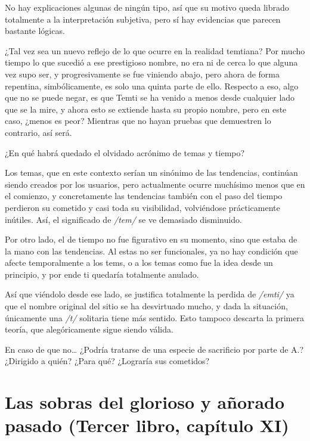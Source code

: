 \documentclass[
]{book}
\begin{document}
No hay explicaciones algunas de ningún tipo, así que su motivo queda librado totalmente a la interpretación subjetiva, pero sí hay evidencias que parecen bastante lógicas.

¿Tal vez sea un nuevo reflejo de lo que ocurre en la realidad temtiana? Por mucho tiempo lo que sucedió a ese prestigioso nombre, no era ni de cerca lo que alguna vez supo ser, y progresivamente se fue viniendo abajo, pero ahora de forma repentina, simbólicamente, es solo una quinta parte de ello. Respecto a eso, algo que no se puede negar, es que Temti se ha venido a menos desde cualquier lado que se la mire, y ahora esto se extiende hasta su propio nombre, pero en este caso, ¿menos es peor? Mientras que no hayan pruebas que demuestren lo contrario, así será.

¿En qué habrá quedado el olvidado acrónimo de temas y tiempo?

Los temas, que en este contexto serían un sinónimo de las tendencias, continúan siendo creados por los usuarios, pero actualmente ocurre muchísimo menos que en el comienzo, y concretamente las tendencias también con el paso del tiempo perdieron su cometido y casi toda su visibilidad, volviéndose prácticamente inútiles. Así, el significado de \emph{/tem/} se ve demasiado disminuido.

Por otro lado, el de tiempo no fue figurativo en su momento, sino que estaba de la mano con las tendencias. Al estas no ser funcionales, ya no hay condición que afecte temporalmente a los tems, o a los temas como fue la idea desde un principio, y por ende ti quedaría totalmente anulado.

Así que viéndolo desde ese lado, se justifica totalmente la perdida de \emph{/emti/} ya que el nombre original del sitio se ha desvirtuado mucho, y dada la situación, únicamente una \emph{/t/} solitaria tiene más sentido. Esto tampoco descarta la primera teoría, que alegóricamente sigue siendo válida.

En caso de que no\ldots{} ¿Podría tratarse de una especie de sacrificio por parte de A.? ¿Dirigido a quién? ¿Para qué? ¿Lograría sus cometidos?

\hypertarget{las-sobras-del-glorioso-y-auxf1orado-pasado-tercer-libro-capuxedtulo-xi}{%
\section{Las sobras del glorioso y añorado pasado (Tercer libro, capítulo XI)}\label{las-sobras-del-glorioso-y-auxf1orado-pasado-tercer-libro-capuxedtulo-xi}}
\end{document}
